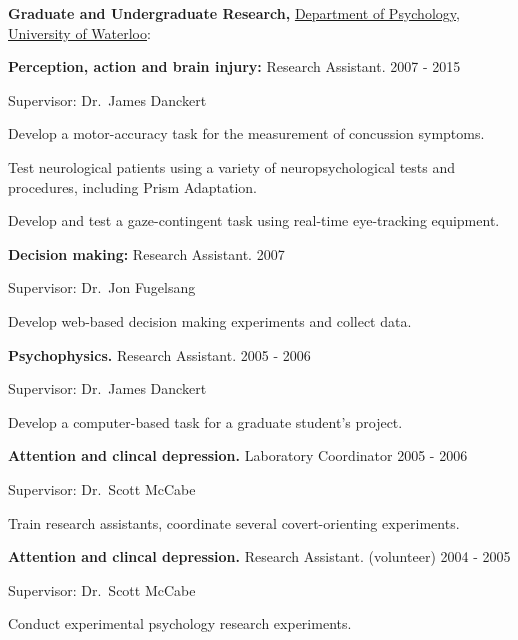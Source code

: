 \documentclass[10pt]{article}
\newenvironment{innerlist}[1][\enskip\textbullet]%
        {\begin{compactenum}[#1]}{\end{compactenum}}
\providecommand{\tightlist}{%
  \setlength{\itemsep}{0pt}\setlength{\parskip}{0pt}}
\begin{document}
\textbf{Graduate and Undergraduate Research,}
\href{http://psychology.uwaterloo.ca}{Department of Psychology},
\href{http://www.uwaterloo.ca/}{University of Waterloo}:

\begin{outerlist}
\tightlist
\item
  \textbf{Perception, action and brain injury:} Research Assistant.
  \hfill 2007 - 2015
\item
  Supervisor: Dr.~James Danckert

 \begin{innerlist}
  \tightlist
  \item
    Develop a motor-accuracy task for the measurement of concussion
    symptoms.
  \item
    Test neurological patients using a variety of neuropsychological
    tests and procedures, including Prism Adaptation.
  \item
    Develop and test a gaze-contingent task using real-time eye-tracking
    equipment.
 \end{innerlist}
\item
  \textbf{Decision making:} Research Assistant. \hfill             2007

 \begin{innerlist}
  \tightlist
  \item
    Supervisor: Dr.~Jon Fugelsang
  \item
    Develop web-based decision making experiments and collect data.
 \end{innerlist}
\item
  \textbf{Psychophysics.} Research Assistant. \hfill               2005
  - 2006

 \begin{innerlist}
  \tightlist
  \item
    Supervisor: Dr.~James Danckert
  \item
    Develop a computer-based task for a graduate student's project.
 \end{innerlist}
\item
  \textbf{Attention and clincal depression.} Laboratory Coordinator
  \hfill                 2005 - 2006

 \begin{innerlist}
  \tightlist
  \item
    Supervisor: Dr.~Scott McCabe
  \item
    Train research assistants, coordinate several covert-orienting
    experiments.
 \end{innerlist}
\item
  \textbf{Attention and clincal depression.} Research Assistant.
  (volunteer) \hfill                    2004 - 2005

 \begin{innerlist}
  \tightlist
  \item
    Supervisor: Dr.~Scott McCabe
  \item
    Conduct experimental psychology research experiments.
 \end{innerlist}
\end{outerlist}
\end{document}
